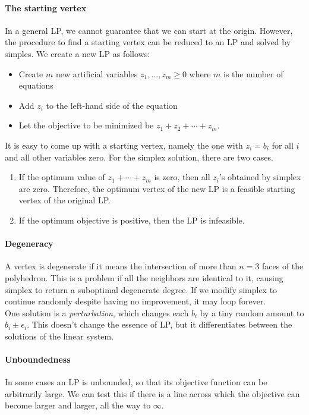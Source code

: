 \paragraph{The starting vertex}
In a general LP, we cannot guarantee that we can start at the origin.
However, the procedure to find a starting vertex can be reduced to an LP and solved by simples.
We create a new LP as follows:
\begin{itemize}
  \item Create $m$ new artificial variables $z_1,\ldots ,z_m \geq 0$ where $m$ is the number of equations
  \item Add $z_i$ to the left-hand side of the equation
  \item Let the objective to be minimized be $z_1 + z_2 + \cdots + z_m$.
\end{itemize}
It is easy to come up with a starting vertex, namely the one with $z_i = b_i$ for all $i$ and all other variables zero.
For the simplex solution, there are two cases.
\begin{enumerate}
  \item If the optimum value of $z_1 + \cdots + z_m$ is zero, then all $z_i$'s obtained by simplex are zero.
    Therefore, the optimum vertex of the new LP is a feasible starting vertex of the original LP.
  \item If the optimum objective is positive, then the LP is infeasible.
\end{enumerate}

\paragraph{Degeneracy}
A vertex is degenerate if it means the intersection of more than $n = 3$ faces of the polyhedron.
This is a problem if all the neighbors are identical to it, causing simplex to return a suboptimal degenerate degree.
If we modify simplex to continue randomly despite having no improvement, it may loop forever.\\
One solution is a \textit{perturbation}, which changes each $b_i$ by a tiny random amount to $b_i \pm \epsilon_i$.
This doesn't change the essence of LP, but it differentiates between the solutions of the linear system.

\paragraph{Unboundedness}
In some cases an LP is unbounded, so that its objective function can be arbitrarily large.
We can test this if there is a line across which the objective can become larger and larger, all the way to $\infty$.

